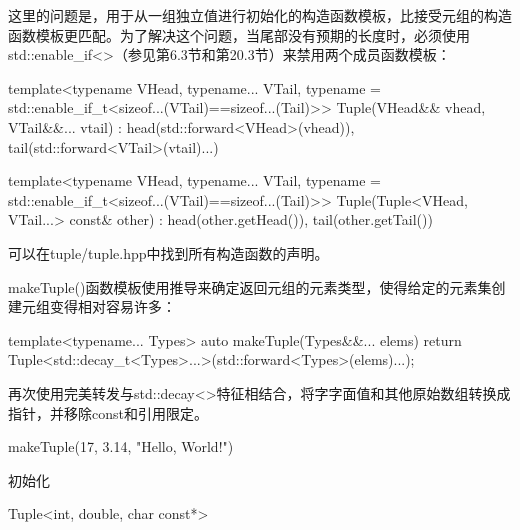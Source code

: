 这里的问题是，用于从一组独立值进行初始化的构造函数模板，比接受元组的构造函数模板更匹配。为了解决这个问题，当尾部没有预期的长度时，必须使用std::enable\_if<>（参见第6.3节和第20.3节）来禁用两个成员函数模板：

\begin{cpp}
template<typename VHead, typename... VTail,
		typename = std::enable_if_t<sizeof...(VTail)==sizeof...(Tail)>>
Tuple(VHead&& vhead, VTail&&... vtail)
: head(std::forward<VHead>(vhead)),
tail(std::forward<VTail>(vtail)...) { }

template<typename VHead, typename... VTail,
		typename = std::enable_if_t<sizeof...(VTail)==sizeof...(Tail)>>
Tuple(Tuple<VHead, VTail...> const& other)
: head(other.getHead()), tail(other.getTail()) { }
\end{cpp}

可以在tuple/tuple.hpp中找到所有构造函数的声明。

makeTuple()函数模板使用推导来确定返回元组的元素类型，使得给定的元素集创建元组变得相对容易许多：

\begin{cpp}
template<typename... Types>
auto makeTuple(Types&&... elems) {
	return Tuple<std::decay_t<Types>...>(std::forward<Types>(elems)...);
}
\end{cpp}

再次使用完美转发与std::decay<>特征相结合，将字字面值和其他原始数组转换成指针，并移除const和引用限定。

\begin{cpp}
makeTuple(17, 3.14, "Hello, World!")
\end{cpp}

初始化

\begin{cpp}
Tuple<int, double, char const*>
\end{cpp}







